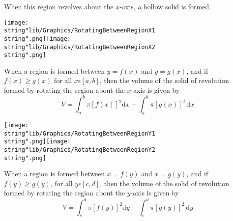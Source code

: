 \documentclass[11pt,a4paper]{book}
\begin{document}
When this region revolves about the $x$-axis, a hollow solid is formed.
\begin{center}
\texttt{[image: \\string"lib/Graphics/RotatingBetweenRegionX1\\string".png]}\hspace{2cm}\texttt{[image: \\string"lib/Graphics/RotatingBetweenRegionX2\\string".png]}
\par\end{center}

\begin{tcolorbox}[colback=blue!5, colframe=black, boxrule=.4pt, sharpish corners]
When a region is formed between $y=f(x)$ and $y=g(x)$, and if $f(x)\geq g(x)$ for all $x\epsilon[a,b]$, then the volume of the solid of revolution formed by rotating the region about the $x$-axis is given by
\[ V=\int_{a}^{b}\pi[f(x)]^{2}\mathrm{d}x-\int_{a}^{b}\pi[g(x)]^{2}\,\mathrm{d}x \]
\end{tcolorbox}
\begin{center}
\texttt{[image: \\string"lib/Graphics/RotatingBetweenRegionY1\\string".png]}\hspace{2cm}\texttt{[image: \\string"lib/Graphics/RotatingBetweenRegionY2\\string".png]}
\par\end{center}

\begin{tcolorbox}[colback=blue!5, colframe=black, boxrule=.4pt, sharpish corners]
When a region is formed between $x=f(y)$ and $x=g(y)$, and if $f(y)\geq g(y)$, for all $y\epsilon[c,d]$, then the volume of the solid of revolution formed by rotating the region about the $y$-axis is given by
\[ V=\int_{c}^{d}\pi[f(y)]^{2}\mathrm{d}y-\int_{c}^{d}\pi[g(y)]^{2}\,\mathrm{d}y \]
\end{tcolorbox}

\newpage{}
\end{document}
